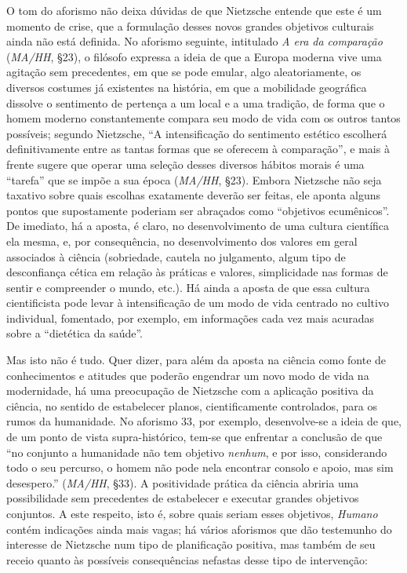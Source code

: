 \documentclass[
	12pt,				%
	openright,			%
	oneside,			%
	a4paper,			%
	english,			%
	french,				%
	spanish,			%
	brazil				%
	]{abntex2}
\begin{document}
O tom do aforismo não deixa dúvidas de que Nietzsche entende que este é um momento de crise, que a formulação desses novos grandes objetivos culturais ainda não está definida. No aforismo seguinte, intitulado \textit{A era da comparação} (\textit{MA/HH}, §23), o filósofo expressa a ideia de que a Europa moderna vive uma agitação sem precedentes, em que se pode emular, algo aleatoriamente, os diversos costumes já existentes na história, em que a mobilidade geográfica dissolve o sentimento de pertença a um local e a uma tradição, de forma que o homem moderno  constantemente compara seu modo de vida com os outros tantos possíveis; segundo Nietzsche, “A intensificação do sentimento estético escolherá definitivamente entre as tantas formas que se oferecem à comparação”, e mais à frente sugere que operar uma seleção desses diversos hábitos morais é uma “tarefa” que se impõe a sua época (\textit{MA/HH}, §23). Embora Nietzsche não seja taxativo sobre quais escolhas exatamente deverão ser feitas, ele aponta alguns pontos que supostamente poderiam ser abraçados como “objetivos ecumênicos”. De imediato, há a aposta, é claro, no desenvolvimento de uma cultura científica ela mesma, e, por consequência, no desenvolvimento dos valores em geral associados à ciência (sobriedade, cautela no julgamento, algum tipo de desconfiança cética em relação às práticas e valores, simplicidade nas formas de sentir e compreender o mundo, etc.). Há ainda a aposta de que essa cultura cientificista pode levar à intensificação de um modo de vida centrado no cultivo individual, fomentado, por exemplo, em informações cada vez mais acuradas sobre a “dietética da saúde”.

Mas isto não é tudo. Quer dizer, para além da aposta na ciência como fonte de conhecimentos e atitudes que poderão engendrar um novo modo de vida na modernidade, há uma preocupação de Nietzsche com a aplicação positiva da ciência, no sentido de estabelecer planos, cientificamente controlados, para os rumos da humanidade. No aforismo 33, por exemplo, desenvolve-se a ideia de que, de um ponto de vista supra-histórico, tem-se que enfrentar a conclusão de que “no conjunto a humanidade não tem objetivo \textit{nenhum}, e por isso, considerando todo o seu percurso, o homem não pode nela encontrar consolo e apoio, mas sim desespero.” (\textit{MA/HH}, §33). A positividade prática da ciência abriria uma possibilidade sem precedentes de estabelecer e executar grandes objetivos conjuntos. A este respeito, isto é, sobre quais seriam esses objetivos, \textit{Humano} contém indicações ainda mais vagas; há vários aforismos que dão testemunho do interesse de Nietzsche num tipo de planificação positiva, mas também de seu receio quanto às possíveis consequências nefastas desse tipo de intervenção:
\end{document}
